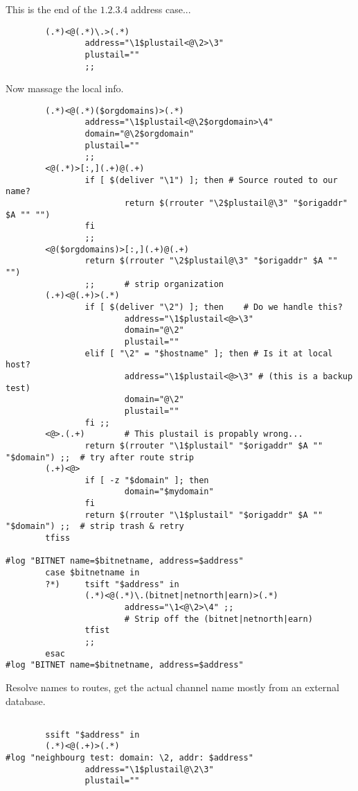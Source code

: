 This is the end of the $1.2.3.4$ address case...

\begin{verbatim}
        (.*)<@(.*)\.>(.*)
                address="\1$plustail<@\2>\3"
                plustail=""
                ;;
\end{verbatim}


Now massage the local info.

\begin{verbatim}
        (.*)<@(.*)($orgdomains)>(.*)
                address="\1$plustail<@\2$orgdomain>\4"
                domain="@\2$orgdomain"
                plustail=""
                ;;
        <@(.*)>[:,](.+)@(.+)
                if [ $(deliver "\1") ]; then # Source routed to our name?
                        return $(rrouter "\2$plustail@\3" "$origaddr" $A "" "")
                fi
                ;;
        <@($orgdomains)>[:,](.+)@(.+)
                return $(rrouter "\2$plustail@\3" "$origaddr" $A "" "")
                ;;      # strip organization
        (.+)<@(.+)>(.*)
                if [ $(deliver "\2") ]; then    # Do we handle this?
                        address="\1$plustail<@>\3"
                        domain="@\2"
                        plustail=""
                elif [ "\2" = "$hostname" ]; then # Is it at local host?
                        address="\1$plustail<@>\3" # (this is a backup test)
                        domain="@\2"
                        plustail=""
                fi ;;
        <@>.(.+)        # This plustail is propably wrong...
                return $(rrouter "\1$plustail" "$origaddr" $A "" "$domain") ;;  # try after route strip
        (.+)<@> 
                if [ -z "$domain" ]; then
                        domain="$mydomain"
                fi
                return $(rrouter "\1$plustail" "$origaddr" $A "" "$domain") ;;  # strip trash & retry
        tfiss

#log "BITNET name=$bitnetname, address=$address"
        case $bitnetname in
        ?*)     tsift "$address" in
                (.*)<@(.*)\.(bitnet|netnorth|earn)>(.*)
                        address="\1<@\2>\4" ;;
                        # Strip off the (bitnet|netnorth|earn)
                tfist
                ;;
        esac
#log "BITNET name=$bitnetname, address=$address"
\end{verbatim}


Resolve names to routes, get the actual channel name mostly from an external database.

\begin{verbatim}

        ssift "$address" in
        (.*)<@(.+)>(.*) 
#log "neighbourg test: domain: \2, addr: $address"
                address="\1$plustail@\2\3"
                plustail=""
\end{verbatim}


